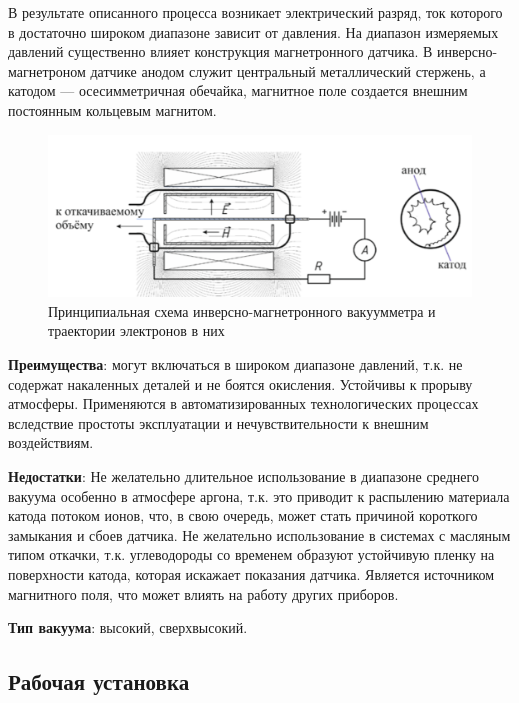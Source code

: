 \documentclass[a4paper, 12pt]{article} %
\begin{document}
В результате описанного процесса возникает электрический разряд, ток которого в достаточно широком диапазоне зависит от давления.
На диапазон измеряемых давлений существенно влияет конструкция магнетронного датчика. В инверсно-магнетроном датчике анодом служит центральный металлический стержень, а катодом — осесимметричная
обечайка, магнитное поле создается внешним постоянным кольцевым
магнитом.

\begin{figure}[h]
    \centering
    \includegraphics[width = 13 cm]{Магнетрон}
    \caption{Принципиальная схема инверсно-магнетронного вакуумметра и траектории электронов в них}
    \label{fig:vac}
\end{figure}

\textbf{Преимущества}: могут включаться в широком диапазоне давлений, т.к. не содержат накаленных деталей и не боятся окисления. Устойчивы к прорыву атмосферы. Применяются в автоматизированных технологических процессах вследствие простоты эксплуатации
и нечувствительности к внешним воздействиям.

\textbf{Недостатки}: Не желательно длительное использование в диапазоне среднего вакуума особенно в атмосфере аргона, т.к. это приводит к распылению материала катода потоком ионов, что, в свою очередь, может стать причиной короткого замыкания и сбоев датчика. Не желательно использование в системах с масляным типом откачки, т.к. углеводороды со временем образуют устойчивую пленку на поверхности катода, которая искажает показания датчика. Является источником магнитного поля, что может влиять на работу других приборов.

\textbf{Тип вакуума}: высокий, сверхвысокий.

\subsection{Рабочая установка}
\end{document}
